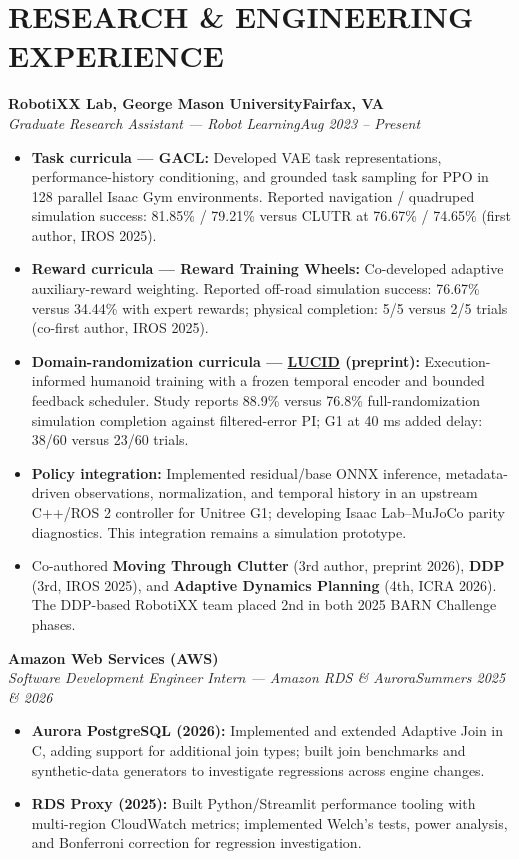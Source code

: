 \documentclass[letterpaper,10pt]{article}
\newcommand{\role}[4]{%
  \textbf{#1}\hfill\textbf{#2}\\[-1pt]
  \textit{#3}\hfill\textit{#4}\par
}
\begin{document}
\section{RESEARCH \& ENGINEERING EXPERIENCE}
\small
\role{RobotiXX Lab, George Mason University}{Fairfax, VA}{Graduate Research Assistant --- Robot Learning}{Aug 2023 -- Present}
\begin{itemize}
  \item \textbf{Task curricula --- GACL:} Developed VAE task representations, performance-history conditioning, and grounded task sampling for PPO in 128 parallel Isaac Gym environments. Reported navigation / quadruped simulation success: 81.85\% / 79.21\% versus CLUTR at 76.67\% / 74.65\% (first author, IROS 2025).
  \item \textbf{Reward curricula --- Reward Training Wheels:} Co-developed adaptive auxiliary-reward weighting. Reported off-road simulation success: 76.67\% versus 34.44\% with expert rewards; physical completion: 5/5 versus 2/5 trials (co-first author, IROS 2025).
  \item \textbf{Domain-randomization curricula --- \href{https://linjiw.github.io/research/\#lucid}{LUCID} (preprint):} Execution-informed humanoid training with a frozen temporal encoder and bounded feedback scheduler. Study reports 88.9\% versus 76.8\% full-randomization simulation completion against filtered-error PI; G1 at 40 ms added delay: 38/60 versus 23/60 trials.
  \item \textbf{Policy integration:} Implemented residual/base ONNX inference, metadata-driven observations, normalization, and temporal history in an upstream C++/ROS 2 controller for Unitree G1; developing Isaac Lab--MuJoCo parity diagnostics. This integration remains a simulation prototype.
  \item Co-authored \textbf{Moving Through Clutter} (3rd author, preprint 2026), \textbf{DDP} (3rd, IROS 2025), and \textbf{Adaptive Dynamics Planning} (4th, ICRA 2026). The DDP-based RobotiXX team placed 2nd in both 2025 BARN Challenge phases.
\end{itemize}

\role{Amazon Web Services (AWS)}{}{Software Development Engineer Intern --- Amazon RDS \& Aurora}{Summers 2025 \& 2026}
\begin{itemize}
  \item \textbf{Aurora PostgreSQL (2026):} Implemented and extended Adaptive Join in C, adding support for additional join types; built join benchmarks and synthetic-data generators to investigate regressions across engine changes.
  \item \textbf{RDS Proxy (2025):} Built Python/Streamlit performance tooling with multi-region CloudWatch metrics; implemented Welch's tests, power analysis, and Bonferroni correction for regression investigation.
\end{itemize}
\end{document}
